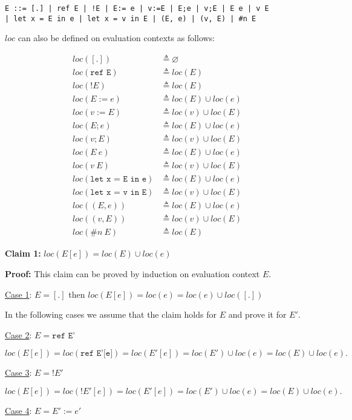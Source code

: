 \documentclass[10pt]{article}
\begin{document}
\begin{enumerate} [(a)]
    \texttt{E ::= [.] | ref E | !E | E:= e | v:=E | E;e | v;E | E e | v E \\
    | let x = E in e | let x = v in E | (E, e) | (v, E) | \#n E}

    $loc$ can also be defined on evaluation contexts as follows:

    \begin{align*}
    loc([.]) &\triangleq \varnothing\\
    loc(\texttt{ref E}) &\triangleq loc(E)\\
    loc(!E) &\triangleq loc(E)\\
    loc(E:=e) &\triangleq loc(E) \cup loc(e)\\
    loc(v:=E) &\triangleq loc(v) \cup loc(E)\\
    loc(E;e) &\triangleq loc(E) \cup loc(e)\\
    loc(v;E) &\triangleq loc(v) \cup loc(E)\\
    loc(E~e) &\triangleq loc(E)\cup loc(e)\\
    loc(v~E) &\triangleq loc(v) \cup loc(E)\\
    loc(\texttt{let x = E in e}) &\triangleq loc(E) \cup loc(e)\\
    loc(\texttt{let x = v in E}) &\triangleq loc(v) \cup loc(E)\\
    loc((E,e)) &\triangleq loc(E) \cup loc(e)\\
    loc((v,E)) &\triangleq loc(v) \cup loc(E)\\
    loc(\#n~E) &\triangleq loc(E)
    \end{align*}

    \textbf{Claim 1:} $loc(E[e]) = loc(E) \cup loc(e)$

    \textbf{Proof:} This claim can be proved by induction on evaluation context $E$.

    \underline{Case 1}: $E = [.]$ then $loc(E[e]) = loc(e) = loc(e) \cup loc([.])$

    In the following cases we assume that the claim holds for $E$ and prove it for $E'$.

    \underline{Case 2}: $E = \texttt{ref E'}$

    $loc(E[e]) = loc(\texttt{ref E'[e]}) = loc(E'[e]) = loc(E') \cup loc(e) = loc(E) \cup loc(e).$

    \underline{Case 3}: $E = !E'$

    $loc(E[e]) = loc(!E'[e]) = loc(E'[e]) = loc(E') \cup loc(e) = loc(E) \cup loc(e).$

    \underline{Case 4}: $E = E':=e'$


\end{enumerate}
\end{document}
